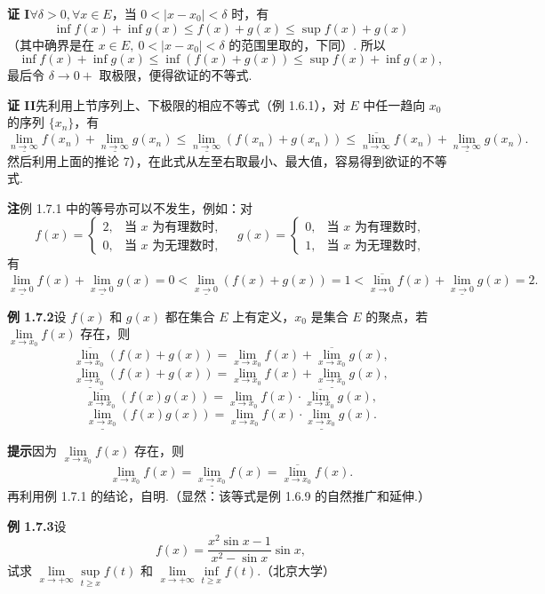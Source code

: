 \documentclass[UTF8,12pt,a4paper,fontset=fandol]{ctexart}
\begin{document}
\noindent\textbf{证 I}\quad $\forall \delta>0,\forall x\in E$，当 $0<|x-x_0|<\delta$ 时，有
\[
  \inf f(x)+\inf g(x)\le f(x)+g(x)\le \sup f(x)+g(x)
\]
（其中确界是在 $x\in E,\ 0<|x-x_0|<\delta$ 的范围里取的，下同）. 所以
\[
  \inf f(x)+\inf g(x)\le \inf(f(x)+g(x))\le \sup f(x)+\inf g(x),
\]
最后令 $\delta\to0+$ 取极限，便得欲证的不等式.

\noindent\textbf{证 II}\quad 先利用上节序列上、下极限的相应不等式（例 1.6.1），对 $E$ 中任一趋向 $x_0$ 的序列 $\{x_n\}$，有
\[
  \underline{\lim_{n\to\infty}}f(x_n)+\underline{\lim_{n\to\infty}}g(x_n)
  \le \underline{\lim_{n\to\infty}}(f(x_n)+g(x_n))
  \le \overline{\lim_{n\to\infty}}f(x_n)+\underline{\lim_{n\to\infty}}g(x_n).
\]
然后利用上面的推论 7），在此式从左至右取最小、最大值，容易得到欲证的不等式.

\noindent\textbf{注}\quad 例 1.7.1 中的等号亦可以不发生，例如：对
\[
  f(x)=
  \begin{cases}
    2, & \text{当 }x\text{ 为有理数时},\\
    0, & \text{当 }x\text{ 为无理数时},
  \end{cases}
  \quad
  g(x)=
  \begin{cases}
    0, & \text{当 }x\text{ 为有理数时},\\
    1, & \text{当 }x\text{ 为无理数时},
  \end{cases}
\]
有
\[
  \underline{\lim_{x\to0}}f(x)+\underline{\lim_{x\to0}}g(x)=0
  <\underline{\lim_{x\to0}}(f(x)+g(x))=1
  <\overline{\lim_{x\to0}}f(x)+\underline{\lim_{x\to0}}g(x)=2.
\]

\noindent\textbf{例 1.7.2}\quad 设 $f(x)$ 和 $g(x)$ 都在集合 $E$ 上有定义，$x_0$ 是集合 $E$ 的聚点，若 $\lim\limits_{x\to x_0}f(x)$ 存在，则
\[
  \overline{\lim_{x\to x_0}}(f(x)+g(x))
  =\lim_{x\to x_0}f(x)+\overline{\lim_{x\to x_0}}g(x),
\]
\[
  \underline{\lim_{x\to x_0}}(f(x)+g(x))
  =\lim_{x\to x_0}f(x)+\underline{\lim_{x\to x_0}}g(x),
\]
\[
  \overline{\lim_{x\to x_0}}(f(x)g(x))
  =\lim_{x\to x_0}f(x)\cdot\overline{\lim_{x\to x_0}}g(x),
\]
\[
  \underline{\lim_{x\to x_0}}(f(x)g(x))
  =\lim_{x\to x_0}f(x)\cdot\underline{\lim_{x\to x_0}}g(x).
\]

\noindent\textbf{提示}\quad 因为 $\lim\limits_{x\to x_0}f(x)$ 存在，则
\[
  \lim_{x\to x_0}f(x)
  =\underline{\lim_{x\to x_0}}f(x)
  =\overline{\lim_{x\to x_0}}f(x).
\]
再利用例 1.7.1 的结论，自明.（显然：该等式是例 1.6.9 的自然推广和延伸.）

\noindent\textbf{例 1.7.3}\quad 设
\[
  f(x)=\frac{x^2\sin x-1}{x^2-\sin x}\sin x,
\]
试求 $\lim\limits_{x\to+\infty}\sup\limits_{t\ge x}f(t)$ 和 $\lim\limits_{x\to+\infty}\inf\limits_{t\ge x}f(t)$.（北京大学）
\end{document}
